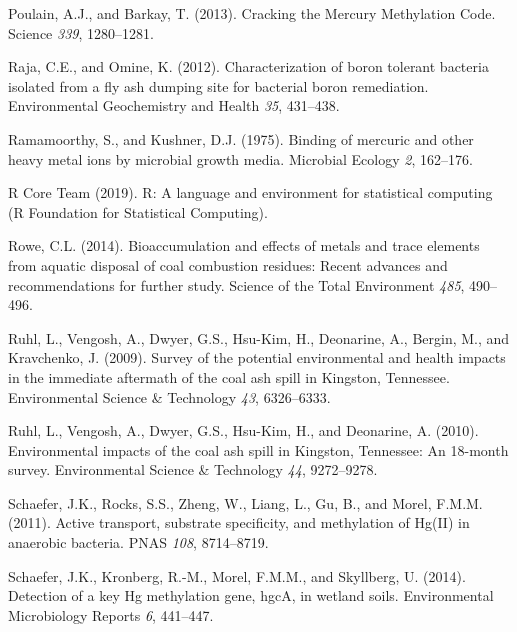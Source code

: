 \documentclass[ms, hidelinks]{uncgdissertationexp}
\theoremstyle{plain}
\theoremstyle{definition}
\theoremstyle{remark}
\begin{document}
\leavevmode\hypertarget{ref-poulainCrackingMercuryMethylation2013}{}%
Poulain, A.J., and Barkay, T. (2013). Cracking the Mercury Methylation Code. Science \emph{339}, 1280--1281.

\leavevmode\hypertarget{ref-rajaCharacterizationBoronTolerant2012}{}%
Raja, C.E., and Omine, K. (2012). Characterization of boron tolerant bacteria isolated from a fly ash dumping site for bacterial boron remediation. Environmental Geochemistry and Health \emph{35}, 431--438.

\leavevmode\hypertarget{ref-ramamoorthyBindingMercuricOther1975}{}%
Ramamoorthy, S., and Kushner, D.J. (1975). Binding of mercuric and other heavy metal ions by microbial growth media. Microbial Ecology \emph{2}, 162--176.

\leavevmode\hypertarget{ref-rcoreteamLanguageEnvironmentStatistical2019}{}%
R Core Team (2019). R: A language and environment for statistical computing (R Foundation for Statistical Computing).

\leavevmode\hypertarget{ref-roweBioaccumulationEffectsMetals2014}{}%
Rowe, C.L. (2014). Bioaccumulation and effects of metals and trace elements from aquatic disposal of coal combustion residues: Recent advances and recommendations for further study. Science of the Total Environment \emph{485}, 490--496.

\leavevmode\hypertarget{ref-ruhlSurveyPotentialEnvironmental2009}{}%
Ruhl, L., Vengosh, A., Dwyer, G.S., Hsu-Kim, H., Deonarine, A., Bergin, M., and Kravchenko, J. (2009). Survey of the potential environmental and health impacts in the immediate aftermath of the coal ash spill in Kingston, Tennessee. Environmental Science \& Technology \emph{43}, 6326--6333.

\leavevmode\hypertarget{ref-ruhlEnvironmentalImpactsCoal2010}{}%
Ruhl, L., Vengosh, A., Dwyer, G.S., Hsu-Kim, H., and Deonarine, A. (2010). Environmental impacts of the coal ash spill in Kingston, Tennessee: An 18-month survey. Environmental Science \& Technology \emph{44}, 9272--9278.

\leavevmode\hypertarget{ref-schaeferActiveTransportSubstrate2011}{}%
Schaefer, J.K., Rocks, S.S., Zheng, W., Liang, L., Gu, B., and Morel, F.M.M. (2011). Active transport, substrate specificity, and methylation of Hg(II) in anaerobic bacteria. PNAS \emph{108}, 8714--8719.

\leavevmode\hypertarget{ref-schaeferDetectionKeyHg2014}{}%
Schaefer, J.K., Kronberg, R.-M., Morel, F.M.M., and Skyllberg, U. (2014). Detection of a key Hg methylation gene, hgcA, in wetland soils. Environmental Microbiology Reports \emph{6}, 441--447.
\end{document}
